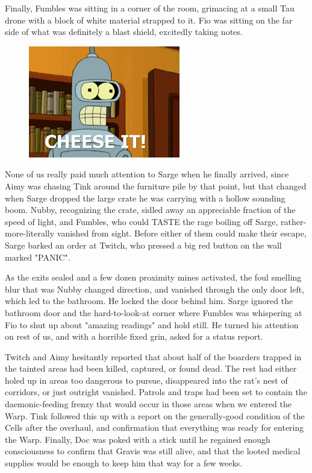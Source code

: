 Finally, Fumbles was sitting in a corner of the room, grimacing at a small Tau drone with a block of white material strapped to it. 
Fio was sitting on the far side of what was definitely a blast shield, excitedly taking notes.

\begin{figure}
	\begin{center}
		\includegraphics[width=\figwidth]{pics/15/3.png}
	\end{center}
\end{figure}
None of us really paid much attention to Sarge when he finally arrived, since Aimy was chasing Tink around the furniture pile by that point, but that changed when Sarge dropped the large crate he was carrying with a hollow sounding boom. 
Nubby, recognizing the crate, sidled away an appreciable fraction of the speed of light, and Fumbles, who could TASTE the rage boiling off Sarge, rather-more-literally vanished from sight. 
Before either of them could make their escape, Sarge barked an order at Twitch, who pressed a big red button on the wall marked "PANIC". 


As the exits sealed and a few dozen proximity mines activated, the foul smelling blur that was Nubby changed direction, and vanished through the only door left, which led to the bathroom. 
He locked the door behind him. 
Sarge ignored the bathroom door and the hard-to-look-at corner where Fumbles was whispering at Fio to shut up about "amazing readings" and hold still. 
He turned his attention on rest of us, and with a horrible fixed grin, asked for a status report. 


Twitch and Aimy hesitantly reported that about half of the boarders trapped in the tainted areas had been killed, captured, or found dead. 
The rest had either holed up in areas too dangerous to pursue, disappeared into the rat's nest of corridors, or just outright vanished. 
Patrols and traps had been set to contain the daemonic-feeding frenzy that would occur in those areas when we entered the Warp. 
Tink followed this up with a report on the generally-good condition of the Cells after the overhaul, and confirmation that everything was ready for entering the Warp. 
Finally, Doc was poked with a stick until he regained enough consciousness to confirm that Gravis was still alive, and that the looted medical supplies would be enough to keep him that way for a few weeks.

